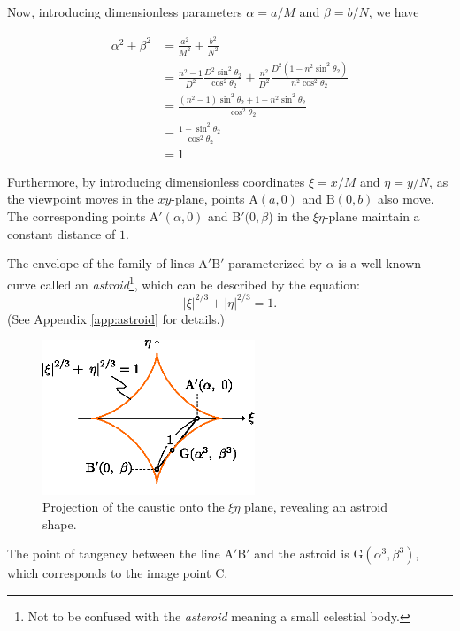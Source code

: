 \documentclass[twocolumn]{article}
\begin{document}
Now, introducing dimensionless parameters $\alpha = a/M$ and $\beta = b/N$, we have

\begin{equation}
	\begin{aligned}
		\alpha^2 + \beta^2 &= \frac{a^2}{M^2} + \frac{b^2}{N^2} \\
		&= \frac{n^2-1}{D^2} \frac{D^2\sin^2\theta_2}{\cos^2\theta_2} + \frac{n^2}{D^2} \frac{D^2(1-n^2\sin^2\theta_2)}{n^2\cos^2\theta_2} \\
		&= \frac{(n^2-1)\sin^2\theta_2 + 1-n^2\sin^2\theta_2}{\cos^2\theta_2} \\
		&= \frac{1-\sin^2\theta_2}{\cos^2\theta_2} \\
		&= 1
	\end{aligned}
\end{equation}

Furthermore, by introducing dimensionless coordinates $\xi = x/M$ and $\eta = y/N$, as the viewpoint moves in the $xy$-plane, points $\mathrm{A}(a, 0)$ and $\mathrm{B}(0, b)$ also move. The corresponding points $\mathrm{A'}(\alpha, 0)$ and $\mathrm{B'}(0, \beta$) in the $\xi\eta$-plane maintain a constant distance of $1$.

The envelope of the family of lines ${\mathrm{A'B'}}$ parameterized by $\alpha$ is a well-known curve called an \emph{astroid}\footnote{Not to be confused with the \emph{asteroid} meaning a small celestial body.}, which can be described by the equation:
$$ \left| \xi \right|^{2/3} + \left| \eta \right|^{2/3} = 1. $$
(See Appendix \ref{app:astroid} for details.)

\begin{figure}
	\centering
	\includegraphics[width=2.5in]{figs/g107.eps}	
	\caption{Projection of the caustic onto the $\xi\eta$ plane, revealing an astroid shape.}
	\label{fig:astroid}
\end{figure}

The point of tangency between the line ${\mathrm{A'B'}}$ and the astroid is $\mathrm{G}(\alpha^3, \beta^3)$, which corresponds to the image point $\mathrm{C}$.
\end{document}
